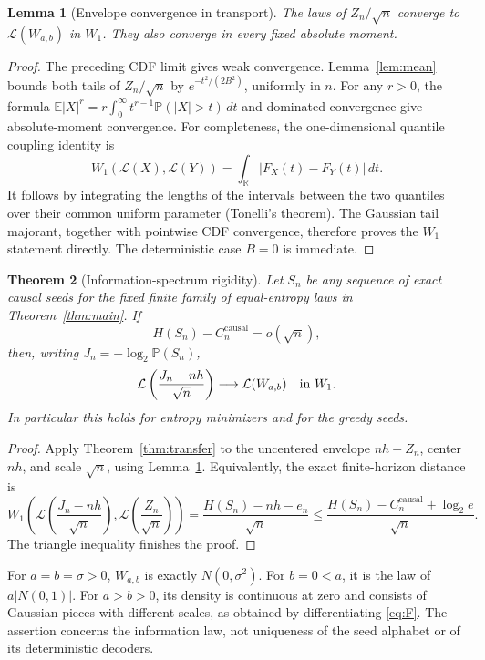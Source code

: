 \documentclass[11pt,a4paper]{article}
\newtheorem{theorem}{Theorem}
\newtheorem{lemma}[theorem]{Lemma}
\newcommand{\E}{\mathbb E}
\newcommand{\Prob}{\mathbb P}
\newcommand{\causal}{\mathrm{causal}}
\newcommand{\R}{\mathbb R}
\begin{document}
\begin{lemma}[Envelope convergence in transport]\label{lem:envw1}
The laws of $Z_n/\sqrt n$ converge to $\mathcal L(W_{a,b})$ in $W_1$.
They also converge in every fixed absolute moment.
\end{lemma}
\begin{proof}
The preceding CDF limit gives weak convergence. Lemma~\ref{lem:mean}
bounds both tails of $Z_n/\sqrt n$ by $e^{-t^2/(2B^2)}$, uniformly in $n$.
For any $r>0$, the formula
$\E|X|^r=r\int_0^\infty t^{r-1}\Prob(|X|>t)\,dt$
and dominated convergence give absolute-moment convergence.
For completeness, the one-dimensional quantile coupling identity is
\[
W_1(\mathcal L(X),\mathcal L(Y))
=\int_{\R}|F_X(t)-F_Y(t)|\,dt.
\]
It follows by integrating the lengths of the intervals between the two
quantiles over their common uniform parameter (Tonelli's theorem).
The Gaussian tail majorant, together with pointwise CDF convergence,
therefore proves the $W_1$ statement directly. The deterministic case
$B=0$ is immediate.
\end{proof}

\begin{theorem}[Information-spectrum rigidity]\label{thm:rigidity}
Let $S_n$ be any sequence of exact causal seeds for the fixed finite
family of equal-entropy laws in Theorem~\ref{thm:main}. If
\[
H(S_n)-C_n^{\causal}=o(\sqrt n),
\]
then, writing $J_n=-\log_2\Prob(S_n)$,
\begin{equation}\label{eq:rigidity}
\mathcal L\left(\frac{J_n-nh}{\sqrt n}\right)
\longrightarrow\mathcal L(W_{a,b})\quad\hbox{in }W_1.
\end{equation}
In particular this holds for entropy minimizers and for the greedy seeds.
\end{theorem}
\begin{proof}
Apply Theorem~\ref{thm:transfer} to the uncentered envelope $nh+Z_n$,
center $nh$, and scale $\sqrt n$, using Lemma~\ref{lem:envw1}.
Equivalently, the exact finite-horizon distance is
\[
W_1\left(\mathcal L\left(\frac{J_n-nh}{\sqrt n}\right),
          \mathcal L\left(\frac{Z_n}{\sqrt n}\right)\right)
=\frac{H(S_n)-nh-e_n}{\sqrt n}
\le\frac{H(S_n)-C_n^{\causal}+\log_2e}{\sqrt n}.
\]
The triangle inequality finishes the proof.
\end{proof}
For $a=b=\sigma>0$, $W_{a,b}$ is exactly $N(0,\sigma^2)$.
For $b=0<a$, it is the law of $a|N(0,1)|$. For $a>b>0$, its density
is continuous at zero and consists of Gaussian pieces with different
scales, as obtained by differentiating \eqref{eq:F}.
The assertion concerns the information law, not uniqueness of the seed
alphabet or of its deterministic decoders.
\end{document}
